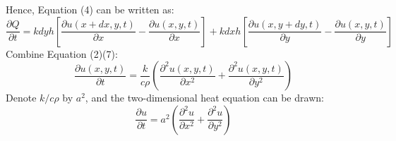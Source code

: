 Hence, Equation (4) can be written as:
\begin{equation}
\frac{\partial Q}{\partial t}=kdyh[\frac{\partial u(x+dx,y,t)}{\partial x}-\frac{\partial u(x,y,t)}{\partial x}]+kdxh[\frac{\partial u(x,y+dy,t)}{\partial y}-\frac{\partial u(x,y,t)}{\partial y}]
\end{equation}
Combine Equation (2)(7):
\begin{equation}
\frac{\partial u(x,y,t)}{\partial t}=\frac{k}{c\rho}(\frac{\partial ^2 u(x,y,t)}{\partial x^2}+\frac{\partial ^2 u(x,y,t)}{\partial y^2})
\end{equation}
Denote $k/c\rho$ by $a^2$, and the two-dimensional heat equation can be drawn:
\begin{equation}
\frac{\partial u}{\partial t}=a^2\left(\frac{\partial ^2 u}{\partial x^2}+\frac{\partial ^2 u}{\partial y^2}\right)
\end{equation}
